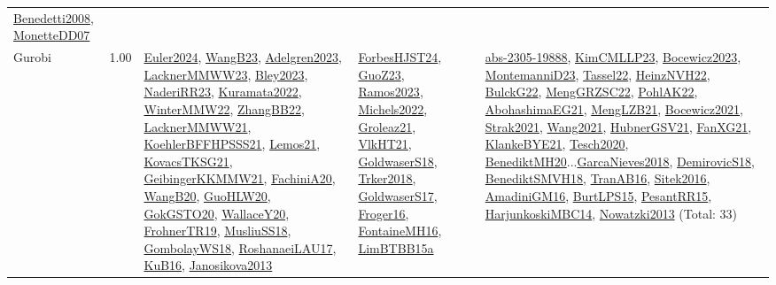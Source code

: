 {\begin{longtable}{p{3cm}r>{\raggedright\arraybackslash}p{6cm}>{\raggedright\arraybackslash}p{6cm}>{\raggedright\arraybackslash}p{8cm}}
\hyperref[detail:Benedetti2008]{Benedetti2008}, \hyperref[detail:MonetteDD07]{MonetteDD07}\\
\index{Gurobi}\index{CPSystems!Gurobi}Gurobi &  1.00 & \hyperref[detail:Euler2024]{Euler2024}, \hyperref[detail:WangB23]{WangB23}, \hyperref[detail:Adelgren2023]{Adelgren2023}, \hyperref[detail:LacknerMMWW23]{LacknerMMWW23}, \hyperref[detail:Bley2023]{Bley2023}, \hyperref[detail:NaderiRR23]{NaderiRR23}, \hyperref[detail:Kuramata2022]{Kuramata2022}, \hyperref[detail:WinterMMW22]{WinterMMW22}, \hyperref[detail:ZhangBB22]{ZhangBB22}, \hyperref[detail:LacknerMMWW21]{LacknerMMWW21}, \hyperref[detail:KoehlerBFFHPSSS21]{KoehlerBFFHPSSS21}, \hyperref[detail:Lemos21]{Lemos21}, \hyperref[detail:KovacsTKSG21]{KovacsTKSG21}, \hyperref[detail:GeibingerKKMMW21]{GeibingerKKMMW21}, \hyperref[detail:FachiniA20]{FachiniA20}, \hyperref[detail:WangB20]{WangB20}, \hyperref[detail:GuoHLW20]{GuoHLW20}, \hyperref[detail:GokGSTO20]{GokGSTO20}, \hyperref[detail:WallaceY20]{WallaceY20}, \hyperref[detail:FrohnerTR19]{FrohnerTR19}, \hyperref[detail:MusliuSS18]{MusliuSS18}, \hyperref[detail:GombolayWS18]{GombolayWS18}, \hyperref[detail:RoshanaeiLAU17]{RoshanaeiLAU17}, \hyperref[detail:KuB16]{KuB16}, \hyperref[detail:Janosikova2013]{Janosikova2013} & \hyperref[detail:ForbesHJST24]{ForbesHJST24}, \hyperref[detail:GuoZ23]{GuoZ23}, \hyperref[detail:Ramos2023]{Ramos2023}, \hyperref[detail:Michels2022]{Michels2022}, \hyperref[detail:Groleaz21]{Groleaz21}, \hyperref[detail:VlkHT21]{VlkHT21}, \hyperref[detail:GoldwaserS18]{GoldwaserS18}, \hyperref[detail:Trker2018]{Trker2018}, \hyperref[detail:GoldwaserS17]{GoldwaserS17}, \hyperref[detail:Froger16]{Froger16}, \hyperref[detail:FontaineMH16]{FontaineMH16}, \hyperref[detail:LimBTBB15a]{LimBTBB15a} & \hyperref[detail:abs-2305-19888]{abs-2305-19888}, \hyperref[detail:KimCMLLP23]{KimCMLLP23}, \hyperref[detail:Bocewicz2023]{Bocewicz2023}, \hyperref[detail:MontemanniD23]{MontemanniD23}, \hyperref[detail:Tassel22]{Tassel22}, \hyperref[detail:HeinzNVH22]{HeinzNVH22}, \hyperref[detail:BulckG22]{BulckG22}, \hyperref[detail:MengGRZSC22]{MengGRZSC22}, \hyperref[detail:PohlAK22]{PohlAK22}, \hyperref[detail:AbohashimaEG21]{AbohashimaEG21}, \hyperref[detail:MengLZB21]{MengLZB21}, \hyperref[detail:Bocewicz2021]{Bocewicz2021}, \hyperref[detail:Strak2021]{Strak2021}, \hyperref[detail:Wang2021]{Wang2021}, \hyperref[detail:HubnerGSV21]{HubnerGSV21}, \hyperref[detail:FanXG21]{FanXG21}, \hyperref[detail:KlankeBYE21]{KlankeBYE21}, \hyperref[detail:Tesch2020]{Tesch2020}, \hyperref[detail:BenediktMH20]{BenediktMH20}...\hyperref[detail:GarcaNieves2018]{GarcaNieves2018}, \hyperref[detail:DemirovicS18]{DemirovicS18}, \hyperref[detail:BenediktSMVH18]{BenediktSMVH18}, \hyperref[detail:TranAB16]{TranAB16}, \hyperref[detail:Sitek2016]{Sitek2016}, \hyperref[detail:AmadiniGM16]{AmadiniGM16}, \hyperref[detail:BurtLPS15]{BurtLPS15}, \hyperref[detail:PesantRR15]{PesantRR15}, \hyperref[detail:HarjunkoskiMBC14]{HarjunkoskiMBC14}, \hyperref[detail:Nowatzki2013]{Nowatzki2013} (Total: 33)\\

\end{longtable}}
